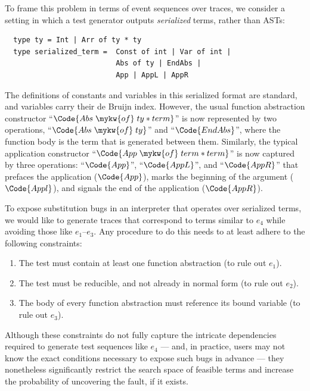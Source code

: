 \begin{example}
To frame this problem in terms of event sequences over traces, we
consider a setting in which a test generator outputs
\emph{serialized} terms, rather than ASTs:
\begin{verbatim}
  type ty = Int | Arr of ty * ty
  type serialized_term =  Const of int | Var of int |
                          Abs of ty | EndAbs |
                          App | AppL | AppR
\end{verbatim}
The definitions of constants and variables in this serialized format
are standard, and variables carry their de Bruijn index. However, the
usual function abstraction constructor ``$\Code{Abs\;\mykw{of}\;ty *
  term}$'' is now represented by two operations,
``$\Code{Abs\;\mykw{of}\;ty}$'' and ``$\Code{EndAbs}$'', where the
function body is the term that is generated between them.  Similarly,
the typical application constructor ``$\Code{App\;\mykw{of}\;term *
  term}$'' is now captured by three operations: ``$\Code{App}$'',
``$\Code{AppL}$'', and ``$\Code{AppR}$'' that prefaces the application
($\Code{App}$), marks the beginning of the argument ($\Code{Appl}$),
and signals the end of the application ($\Code{AppR}$).

To expose substitution bugs in an interpreter that operates over
serialized terms, we would like to generate traces that correspond to
terms similar to $e_4$ while avoiding those like $e_1$--$e_3$.  Any
procedure to do this needs to at least adhere to the following
constraints:
\begin{enumerate}
  \item The test must contain at least one function abstraction (to rule out $e_1$).
  \item The test must be reducible, and not already in normal form (to rule out $e_2$).
  \item The body of every function abstraction must reference its
    bound variable (to rule out $e_3$).
\end{enumerate}
Although these constraints do not fully capture the intricate
dependencies required to generate test sequences like $e_4$ — and,
in practice, users may not know the exact conditions necessary to
expose such bugs in advance — they nonetheless significantly restrict
the search space of feasible terms and increase the probability of
uncovering the fault, if it exists.


\end{example}
